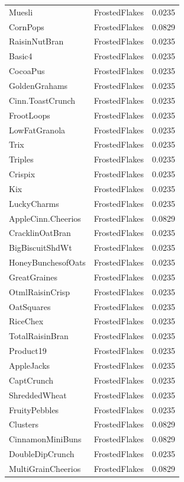 \begin{table}[!htbp]
\begin{tabular}{lll}
\\
Muesli & FrostedFlakes & 0.0235
\\
CornPops & FrostedFlakes & 0.0829
\\
RaisinNutBran & FrostedFlakes & 0.0235
\\
Basic4 & FrostedFlakes & 0.0235
\\
CocoaPus & FrostedFlakes & 0.0235
\\
GoldenGrahams & FrostedFlakes & 0.0235
\\
Cinn.ToastCrunch & FrostedFlakes & 0.0235
\\
FrootLoops & FrostedFlakes & 0.0235
\\
LowFatGranola & FrostedFlakes & 0.0235
\\
Trix & FrostedFlakes & 0.0235
\\
Triples & FrostedFlakes & 0.0235
\\
Crispix & FrostedFlakes & 0.0235
\\
Kix & FrostedFlakes & 0.0235
\\
LuckyCharms & FrostedFlakes & 0.0235
\\
AppleCinn.Cheerios & FrostedFlakes & 0.0829
\\
CracklinOatBran & FrostedFlakes & 0.0235
\\
BigBiscuitShdWt & FrostedFlakes & 0.0235
\\
HoneyBunchesofOats & FrostedFlakes & 0.0235
\\
GreatGraines & FrostedFlakes & 0.0235
\\
OtmlRaisinCrisp & FrostedFlakes & 0.0235
\\
OatSquares & FrostedFlakes & 0.0235
\\
RiceChex & FrostedFlakes & 0.0235
\\
TotalRaisinBran & FrostedFlakes & 0.0235
\\
Product19 & FrostedFlakes & 0.0235
\\
AppleJacks & FrostedFlakes & 0.0235
\\
CaptCrunch & FrostedFlakes & 0.0235
\\
ShreddedWheat & FrostedFlakes & 0.0235
\\
FruityPebbles & FrostedFlakes & 0.0235
\\
Clusters & FrostedFlakes & 0.0829
\\
CinnamonMiniBuns & FrostedFlakes & 0.0829
\\
DoubleDipCrunch & FrostedFlakes & 0.0235
\\
MultiGrainCheerios & FrostedFlakes & 0.0829
\\

\end{tabular}
\end{table}
